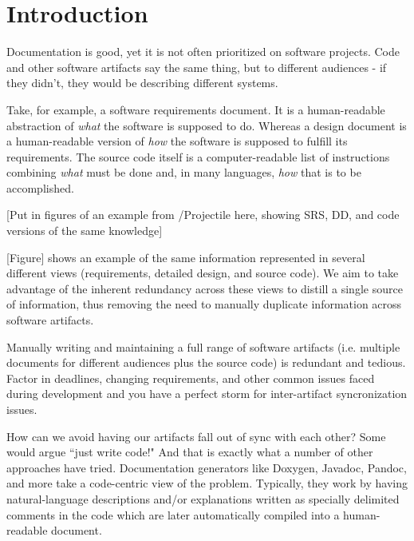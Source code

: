 \chapter{Introduction}


Documentation is good\citep{??}, yet it is not often prioritized on software
projects. Code and other software artifacts say the same thing, but to different
audiences - if they didn't, they would be describing different systems.

Take, for example, a software requirements document. It is a human-readable
abstraction of \textit{what} the software is supposed to do. Whereas a design 
document is a human-readable version of \textit{how} the software is supposed 
to fulfill its requirements. The source code itself is a computer-readable list 
of instructions combining \textit{what} must be done and, in many languages, 
\textit{how} that is to be accomplished.

[Put in figures of an example from \gb{}/Projectile here, showing SRS, DD, and
code versions of the same knowledge]

[Figure] shows an example of the same information represented in several
different views (requirements, detailed design, and source code). We aim to
take advantage of the inherent redundancy across these views to distill a single
source of information, thus removing the need to manually duplicate information
across software artifacts.

Manually writing and maintaining a full range of software artifacts (i.e.
multiple documents for different audiences plus the source code) is
redundant and tedious. Factor in deadlines, changing requirements, and other
common issues faced during development and you have a perfect storm for
inter-artifact syncronization issues.

How can we avoid having our artifacts fall out of sync with each other?
Some would argue ``just write code!" And that is exactly what a number of other
approaches have tried. Documentation generators like Doxygen, Javadoc, Pandoc,
and more take a code-centric view of the problem. Typically, they work by having
natural-language descriptions and/or explanations written as specially delimited
comments in the code which are later automatically compiled into a
human-readable document.

